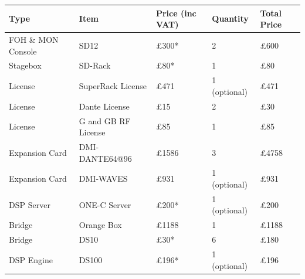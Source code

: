                 \begin{longtable}[H]{|p{3cm}|p{4cm}|p{2cm}|p{3cm}|p{2cm}|}
                \hline
\textbf{Type} & \textbf{Item} & \textbf{Price (inc VAT)} & \textbf{Quantity} & \textbf{Total Price} \\ \hline
\endfirsthead
%
\endhead
%
\rowcolor[HTML]{EFEFEF} 
FOH \& MON Console                 & SD12                               & \cellcolor[HTML]{EFEFEF}£300* & 2                                  & £600   \\ \hline
Stagebox                           & SD-Rack                            & £80*                          & 1                                  & £80    \\ \hline
\rowcolor[HTML]{EFEFEF} 
License                            & SuperRack License                  & \cellcolor[HTML]{EFEFEF}£471  & 1 (optional)                       & £471   \\ \hline
\rowcolor[HTML]{EFEFEF} 
License                            & Dante License                      & \cellcolor[HTML]{EFEFEF}£15   & 2                                  & £30    \\ \hline
\rowcolor[HTML]{EFEFEF} 
License                            & G and GB RF License                & \cellcolor[HTML]{EFEFEF}£85   & 1                                  & £85    \\ \hline
Expansion Card                     & DMI-DANTE64@96                     & £1586                         & 3                                  & £4758  \\ \hline
Expansion Card                     & DMI-WAVES                          & £931                          & 1 (optional)                       & £931   \\ \hline
\rowcolor[HTML]{EFEFEF} 
DSP Server                         & ONE-C Server                       & £200*                         & 1 (optional)                       & £200   \\ \hline
Bridge                             & Orange Box                         & £1188                         & 1                                  & £1188  \\ \hline
Bridge                             & DS10                               & £30*                          & 6                                  & £180   \\ \hline
\rowcolor[HTML]{EFEFEF} 
DSP Engine                         & DS100                              & £196*                         & 1 (optional)                       & £196   \\ \hline

\end{longtable}
